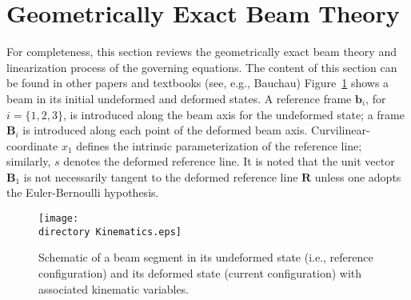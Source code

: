 
\section{Geometrically Exact Beam Theory}

For completeness, this section reviews the geometrically exact beam theory
and linearization process of the governing equations. The content of this
section can be found in other papers and textbooks (see, e.g., 
Bauchau\cite{Bauchau:2010})
Figure~\ref{Kinematics} shows a beam in its initial undeformed and deformed
states. A reference frame $\mathbf{b}_i$, for $i=\{ 1,2,3 \}$, is introduced
along the beam axis for the undeformed state; a frame $\mathbf{B}_i$ is
introduced along each point of the deformed beam axis.
Curvilinear-coordinate $x_1$ defines the intrinsic parameterization of the
reference line; similarly, $s$ denotes the deformed reference line. It is noted that the unit vector $\mathbf{B}_1$ is not necessarily tangent to the deformed reference line $\textbf{R}$ unless one adopts the Euler-Bernoulli hypothesis.

\begin{figure}
\centering \texttt{[image: \\directory Kinematics.eps]}
\caption{Schematic of a beam segment in its undeformed state (i.e.,
reference configuration) and its deformed state (current configuration) with
associated kinematic variables.} \label{Kinematics}
\end{figure}

